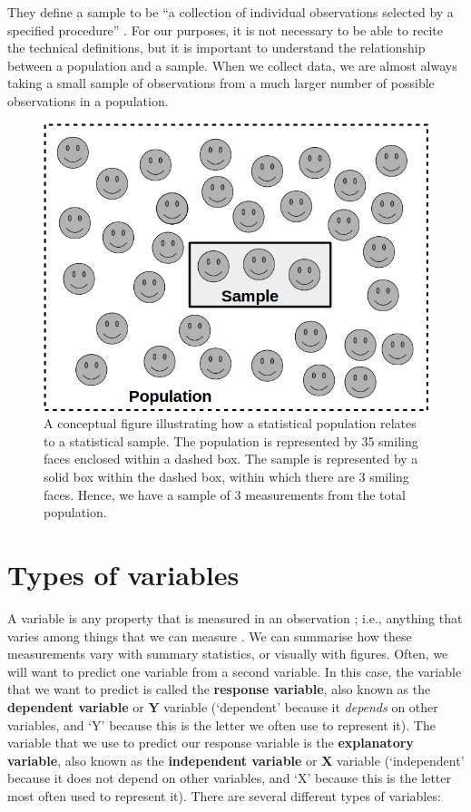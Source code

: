 \documentclass[
]{scrbook}
\begin{document}
They define a sample to be ``a collection of individual observations selected by a specified procedure'' \citep{Sokal1995}.
For our purposes, it is not necessary to be able to recite the technical definitions, but it is important to understand the relationship between a population and a sample.
When we collect data, we are almost always taking a small sample of observations from a much larger number of possible observations in a population.

\begin{figure}
\includegraphics[width=1\linewidth]{img/population_vs_sample} \caption{A conceptual figure illustrating how a statistical population relates to a statistical sample. The population is represented by 35 smiling faces enclosed within a dashed box. The sample is represented by a solid box within the dashed box, within which there are 3 smiling faces. Hence, we have a sample of 3 measurements from the total population.}\label{fig:unnamed-chunk-18}
\end{figure}

\hypertarget{Chapter_5}{%
\chapter{Types of variables}\label{Chapter_5}}

A variable is any property that is measured in an observation \citep{Sokal1995}; i.e., anything that varies among things that we can measure \citep{Dytham2011}.
We can summarise how these measurements vary with summary statistics, or visually with figures.
Often, we will want to predict one variable from a second variable.
In this case, the variable that we want to predict is called the \textbf{response variable}, also known as the \textbf{dependent variable} or \textbf{Y} variable (`dependent' because it \emph{depends} on other variables, and `Y' because this is the letter we often use to represent it).
The variable that we use to predict our response variable is the \textbf{explanatory variable}, also known as the \textbf{independent variable} or \textbf{X} variable (`independent' because it does not depend on other variables, and `X' because this is the letter most often used to represent it).
There are several different types of variables:
\end{document}
